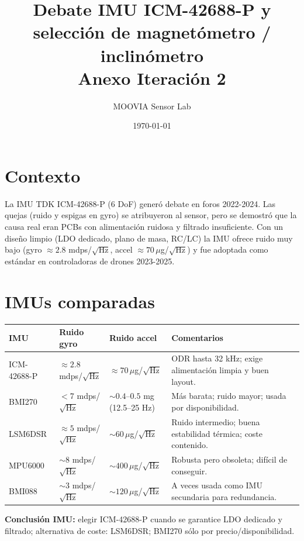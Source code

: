 \documentclass[11pt,a4paper]{article}
\title{Debate IMU ICM-42688-P y selección de magnetómetro / inclinómetro \\ \small{Anexo Iteración 2}}
\author{MOOVIA Sensor Lab}
\date{\today}
\begin{document}
\maketitle

\section{Contexto}
La IMU TDK ICM-42688-P (6 DoF) generó debate en foros 2022-2024. Las quejas (ruido y espigas en gyro) se atribuyeron al sensor, pero se demostró que la causa real eran PCBs con alimentación ruidosa y filtrado insuficiente. Con un diseño limpio (LDO dedicado, plano de masa, RC/LC) la IMU ofrece ruido muy bajo (gyro $\approx 2.8$ mdps/$\sqrt{\text{Hz}}$, accel $\approx 70\,\mu$g/$\sqrt{\text{Hz}}$) y fue adoptada como estándar en controladoras de drones 2023-2025.

\section{IMUs comparadas}
\begin{longtable}{|>{\raggedright}p{3cm}|>{\raggedright}p{3cm}|>{\raggedright}p{3cm}|>{\raggedright\arraybackslash}p{4cm}|}
\hline
\textbf{IMU} & \textbf{Ruido gyro} & \textbf{Ruido accel} & \textbf{Comentarios} \\
\hline
ICM-42688-P & $\approx 2.8$ mdps/$\sqrt{\text{Hz}}$ & $\approx 70\,\mu$g/$\sqrt{\text{Hz}}$ & ODR hasta 32 kHz; exige alimentación limpia y buen layout. \\
\hline
BMI270 & $<7$ mdps/$\sqrt{\text{Hz}}$ & $\sim 0.4$--$0.5$ mg (12.5–25 Hz) & Más barata; ruido mayor; usada por disponibilidad. \\
\hline
LSM6DSR & $\approx 5$ mdps/$\sqrt{\text{Hz}}$ & $\sim 60\,\mu$g/$\sqrt{\text{Hz}}$ & Ruido intermedio; buena estabilidad térmica; coste contenido. \\
\hline
MPU6000 & $\sim 8$ mdps/$\sqrt{\text{Hz}}$ & $\sim 400\,\mu$g/$\sqrt{\text{Hz}}$ & Robusta pero obsoleta; difícil de conseguir. \\
\hline
BMI088 & $\sim 3$ mdps/$\sqrt{\text{Hz}}$ & $\sim 120\,\mu$g/$\sqrt{\text{Hz}}$ & A veces usada como IMU secundaria para redundancia. \\
\hline
\end{longtable}

\textbf{Conclusión IMU:} elegir ICM-42688-P cuando se garantice LDO dedicado y filtrado; alternativa de coste: LSM6DSR; BMI270 sólo por precio/disponibilidad.
\end{document}
